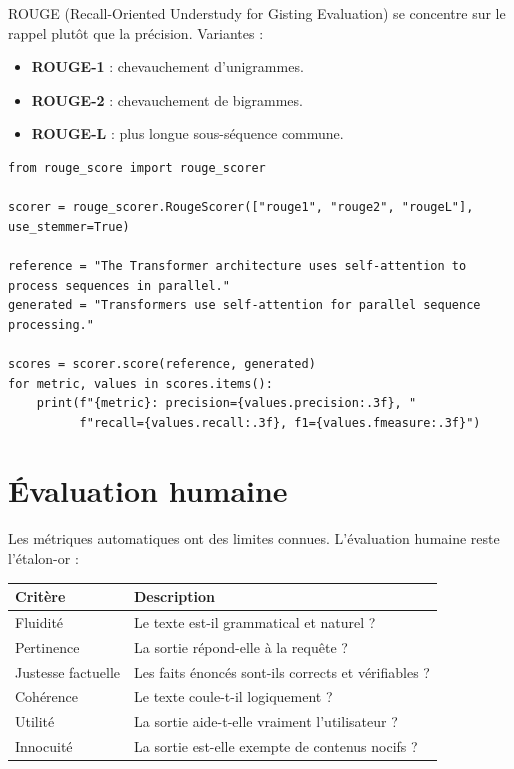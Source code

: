 ROUGE (Recall-Oriented Understudy for Gisting Evaluation) se concentre sur le rappel plut\^ot que la pr\'ecision. Variantes :
\begin{itemize}
  \item \textbf{ROUGE-1} : chevauchement d'unigrammes.
  \item \textbf{ROUGE-2} : chevauchement de bigrammes.
  \item \textbf{ROUGE-L} : plus longue sous-s\'equence commune.
\end{itemize}

\begin{verbatim}
from rouge_score import rouge_scorer

scorer = rouge_scorer.RougeScorer(["rouge1", "rouge2", "rougeL"], use_stemmer=True)

reference = "The Transformer architecture uses self-attention to process sequences in parallel."
generated = "Transformers use self-attention for parallel sequence processing."

scores = scorer.score(reference, generated)
for metric, values in scores.items():
    print(f"{metric}: precision={values.precision:.3f}, "
          f"recall={values.recall:.3f}, f1={values.fmeasure:.3f}")
\end{verbatim}

\section{\'Evaluation humaine}

Les m\'etriques automatiques ont des limites connues. L'\'evaluation humaine reste l'\'etalon-or :

\begin{longtable}{p{3cm}p{9.5cm}}
\toprule
\textbf{Crit\`ere} & \textbf{Description} \\
\midrule
Fluidit\'e & Le texte est-il grammatical et naturel ? \\
Pertinence & La sortie r\'epond-elle \`a la requ\^ete ? \\
Justesse factuelle & Les faits \'enonc\'es sont-ils corrects et v\'erifiables ? \\
Coh\'erence & Le texte coule-t-il logiquement ? \\
Utilit\'e & La sortie aide-t-elle vraiment l'utilisateur ? \\
Innocuit\'e & La sortie est-elle exempte de contenus nocifs ? \\
\bottomrule
\end{longtable}

